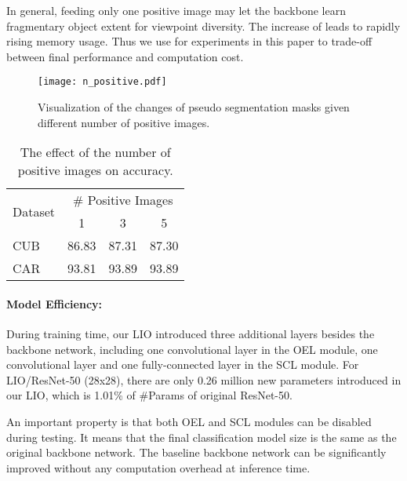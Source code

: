 \documentclass[10pt,twocolumn,letterpaper]{article}
\begin{document}
In general, feeding only one positive image may let the backbone learn fragmentary object extent for viewpoint diversity. The increase of  leads to rapidly rising memory usage. Thus we use  for experiments in this paper to trade-off between final performance and computation cost.
\begin{figure}[!t]
    \centerline{
    \texttt{[image: n\_positive.pdf]}
    }
    \caption{Visualization of the changes
of pseudo segmentation masks given different number of positive images.}
\label{fig:positive_images} 
\end{figure}
\begin{table}[!t]
\small
\begin{center}
    \begin{tabular}{|l|ccc|}
    \hline
    \multicolumn{1}{|c|}{\multirow{2}{*}{Dataset}}  & \multicolumn{3}{c|}{\# Positive Images}  \\ \cline{2-4} 
    \multicolumn{1}{|c|}{} & 1 & 3 & 5 \\ \hline\hline
    CUB & 86.83 & 87.31 & 87.30  \\
    CAR & 93.81 & 93.89 & 93.89  \\
    \hline
\end{tabular}
\end{center}
    \caption{The effect of the number of positive images on accuracy.}
    \label{tab:exp-num-positive}
\end{table}

\paragraph{\textbf{Model Efficiency:}}
During training time, our LIO introduced three additional layers besides the backbone network, including one convolutional layer in the OEL module, one convolutional layer and one fully-connected layer in the SCL module. 
For LIO/ResNet-50 (28x28), there are only 0.26  million new parameters introduced in our LIO, which is 1.01\% of \#Params of original ResNet-50. 

An important property is that both OEL and SCL modules can be disabled during testing. It means that the final classification model size is the same as the original backbone network. The baseline backbone network can be significantly improved without any computation overhead at inference time.
\end{document}
